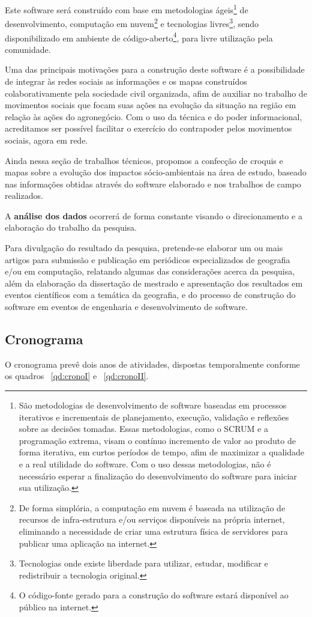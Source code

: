 Este software será construído com base em metodologias ágeis\footnote{São metodologias de desenvolvimento de software baseadas em processos iterativos e incrementais de planejamento, execução, validação e reflexões sobre as decisões tomadas. Essas metodologias, como o SCRUM e a programação extrema, visam o contínuo incremento de valor ao produto de forma iterativa, em curtos períodos de tempo, afim de maximizar a qualidade e a real utilidade do software. Com o uso dessas metodologias, não é necessário esperar a finalização do desenvolvimento do software para iniciar sua utilização.} de desenvolvimento, computação em nuvem\footnote{De forma simplória, a computação em nuvem é baseada na utilização de recursos de infra-estrutura e/ou serviços disponíveis na própria internet, eliminando a necessidade de criar uma estrutura física de servidores para publicar uma aplicação na internet.} e tecnologias livres\footnote{Tecnologias onde existe liberdade para utilizar, estudar, modificar e redistribuir a tecnologia original.}, sendo disponibilizado em ambiente de código-aberto\footnote{O código-fonte gerado para a construção do software estará disponível ao público na internet.}, para livre utilização pela comunidade.

Uma das principais motivações para a construção deste software é a possibilidade de integrar às redes sociais as informações e os mapas construídos colaborativamente pela sociedade civil organizada, afim de auxiliar no trabalho de movimentos sociais que focam suas ações na evolução da situação na região em relação às ações do agronegócio. Com o uso da técnica e do poder informacional, acreditamos ser possível facilitar o exercício do contrapoder pelos movimentos sociais, agora em rede.

Ainda nessa seção de trabalhos técnicos, propomos a confecção de croquis e mapas sobre a evolução dos impactos sócio-ambientais na área de estudo, baseado nas informações obtidas através do software elaborado e nos trabalhos de campo realizados.

A \textbf{análise dos dados} ocorrerá de forma constante visando o direcionamento e a elaboração do trabalho da pesquisa. 

Para divulgação do resultado da pesquisa, pretende-se elaborar um ou mais artigos para submissão e publicação em periódicos especializados de geografia e/ou em computação, relatando algumas das considerações acerca da pesquisa, além da elaboração da dissertação de mestrado e apresentação dos resultados em eventos científicos com a temática da geografia, e do processo de construção do software em eventos de engenharia e desenvolvimento de software.

\subsection{Cronograma}

O cronograma prevê dois anos de atividades, dispostas temporalmente conforme os quadros ~\ref{qd:cronoI} e ~\ref{qd:cronoII}.



